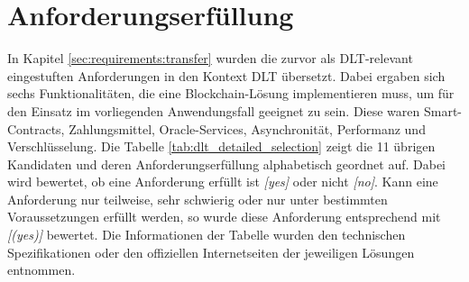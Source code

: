 %
%
\section{Anforderungserfüllung}
\label{sec:dlt_selection:fullfilment}
In Kapitel \ref{sec:requirements:transfer} wurden die zurvor als \ac{DLT}-relevant eingestuften Anforderungen in den Kontext \ac{DLT} übersetzt. Dabei ergaben sich sechs Funktionalitäten, die eine Blockchain-Lösung implementieren muss, um für den Einsatz im vorliegenden Anwendungsfall geeignet zu sein. Diese waren Smart-Contracts, Zahlungsmittel, Oracle-Services, Asynchronität, Performanz und Verschlüsselung. Die Tabelle \ref{tab:dlt_detailed_selection} zeigt die 11 übrigen Kandidaten und deren Anforderungserfüllung alphabetisch geordnet auf. Dabei wird bewertet, ob eine Anforderung erfüllt ist \textit{[yes]} oder nicht \textit{[no]}. Kann eine Anforderung nur teilweise, sehr schwierig oder nur unter bestimmten Voraussetzungen erfüllt werden, so wurde diese Anforderung entsprechend mit \textit{[(yes)]} bewertet. Die Informationen der Tabelle wurden den technischen Spezifikationen oder den offiziellen Internetseiten der jeweiligen Lösungen entnommen.

